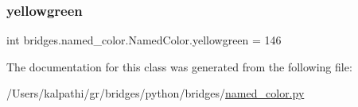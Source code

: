 \mbox{\label{classbridges_1_1named__color_1_1_named_color_a74aef0729d05ac029a522364fd21dd7a}} 
\subsubsection{\texorpdfstring{yellowgreen}{yellowgreen}}
{\footnotesize\ttfamily int bridges.\+named\+\_\+color.\+Named\+Color.\+yellowgreen = 146\hspace{0.3cm}{\ttfamily [static]}}



The documentation for this class was generated from the following file\+:\begin{DoxyCompactItemize}
\item 
/\+Users/kalpathi/gr/bridges/python/bridges/\mbox{\hyperlink{named__color_8py}{named\+\_\+color.\+py}}\end{DoxyCompactItemize}
